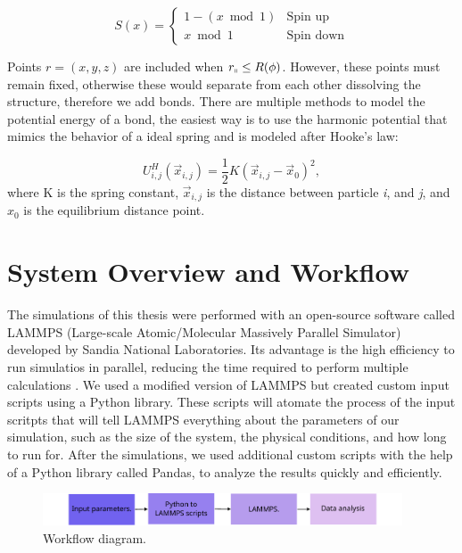 \begin{equation}
S(x) = \begin{cases}
1 - (x \bmod 1) & \text{Spin up} \\
x \bmod 1 & \text{Spin down}
\end{cases}
\end{equation}

Points $r = (x, y, z)$ are included when $r_{\shortparallel} \leq R(\phi)$.
However, these points must remain fixed, otherwise these would separate from each other dissolving the structure, therefore we add bonds.
There are multiple methods to model the potential energy of a bond, the easiest way is to use the harmonic potential that mimics the behavior of a ideal spring and is modeled after Hooke's law:

\begin{equation}
  U^{H}_{i,j}(\vec{x}_{i,j}) = \frac{1}{2}K(\vec{x}_{i,j} - \vec{x}_0)^2,
\end{equation}
where K is the spring constant, $\vec{x}_{i,j}$ is the distance between particle \textit{i}, and \textit{j}, and $x_0$ is the equilibrium distance point.

\section{System Overview and Workflow}

The simulations of this thesis were performed with an open-source software called LAMMPS (Large-scale Atomic/Molecular Massively Parallel Simulator) developed by Sandia National Laboratories. Its advantage is the high efficiency to run simulatios in parallel, reducing the time required to perform multiple calculations \cite{LAMMPS}. We used a modified version of LAMMPS but created custom input scripts using a Python library. These scripts will atomate the process of the input scritpts that will tell LAMMPS everything about the parameters of our simulation, such as the size of the system, the physical conditions, and how long to run for. After the simulations, we used additional custom scripts with the help of a Python library called Pandas, to analyze the results quickly and efficiently.

\begin{figure}[h]
  \begin{center}
    \includegraphics[width=0.95\textwidth]{figures/workflow.pdf}
  \end{center}
  \caption[Workflow diagram.]{Workflow diagram.}\label{fig:workflow}
\end{figure}

